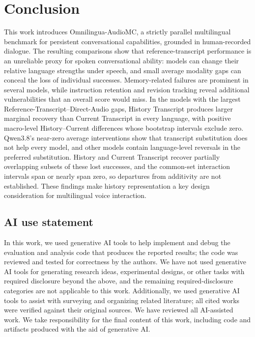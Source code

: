 \documentclass{article}
\begin{document}
\section{Conclusion}

This work introduces Omnilingua-AudioMC, a strictly parallel multilingual benchmark for persistent conversational capabilities, grounded in human-recorded dialogue. The resulting comparisons show that reference-transcript performance is an unreliable proxy for spoken conversational ability: models can change their relative language strengths under speech, and small average modality gaps can conceal the loss of individual successes. Memory-related failures are prominent in several models, while instruction retention and revision tracking reveal additional vulnerabilities that an overall score would miss.
In the models with the largest Reference-Transcript--Direct-Audio gaps, History Transcript produces larger marginal recovery than Current Transcript in every language, with positive macro-level History--Current differences whose bootstrap intervals exclude zero. Qwen3.8's near-zero average interventions show that transcript substitution does not help every model, and other models contain language-level reversals in the preferred substitution. History and Current Transcript recover partially overlapping subsets of these lost successes, and the common-set interaction intervals span or nearly span zero, so departures from additivity are not established. These findings make history representation a key design consideration for multilingual voice interaction.


\subsection*{AI use statement}

In this work, we used generative AI tools to help implement and debug the evaluation and analysis code that produces the reported results; the code was reviewed and tested for correctness by the authors. We have not used generative AI tools for generating research ideas, experimental designs, or other tasks with required disclosure beyond the above, and the remaining required-disclosure categories are not applicable to this work. Additionally, we used generative AI tools to assist with surveying and organizing related literature; all cited works were verified against their original sources. We have reviewed all AI-assisted work. We take responsibility for the final content of this work, including code and artifacts produced with the aid of generative AI.
\end{document}
